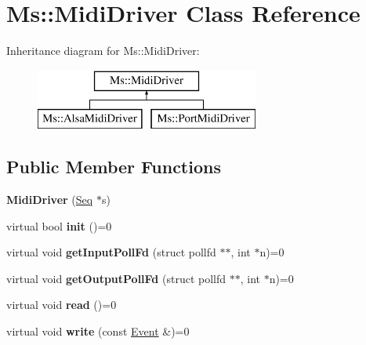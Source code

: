 \hypertarget{class_ms_1_1_midi_driver}{}\section{Ms\+:\+:Midi\+Driver Class Reference}
\label{class_ms_1_1_midi_driver}
Inheritance diagram for Ms\+:\+:Midi\+Driver\+:\begin{figure}[H]
\begin{center}
\leavevmode
\includegraphics[height=2.000000cm]{class_ms_1_1_midi_driver}
\end{center}
\end{figure}
\subsection*{Public Member Functions}
\begin{DoxyCompactItemize}
\item 
\mbox{\label{class_ms_1_1_midi_driver_a4430e34bb07cbcc8132f1eea7d6f724d}} 
{\bfseries Midi\+Driver} (\hyperlink{class_ms_1_1_seq}{Seq} $\ast$s)
\item 
\mbox{\label{class_ms_1_1_midi_driver_af1614804b78d0330a27b505ad9f423d9}} 
virtual bool {\bfseries init} ()=0
\item 
\mbox{\label{class_ms_1_1_midi_driver_a3b81bf9f67ecab52993e225e07888608}} 
virtual void {\bfseries get\+Input\+Poll\+Fd} (struct pollfd $\ast$$\ast$, int $\ast$n)=0
\item 
\mbox{\label{class_ms_1_1_midi_driver_a65e552f40916a077b278cf11a71335e5}} 
virtual void {\bfseries get\+Output\+Poll\+Fd} (struct pollfd $\ast$$\ast$, int $\ast$n)=0
\item 
\mbox{\label{class_ms_1_1_midi_driver_a4c2d20f48384a060b40486ed39b3cee7}} 
virtual void {\bfseries read} ()=0
\item 
\mbox{\label{class_ms_1_1_midi_driver_ac2c112933879e9e74c03456b2c3b2b1d}} 
virtual void {\bfseries write} (const \hyperlink{class_ms_1_1_event}{Event} \&)=0
\end{DoxyCompactItemize}

